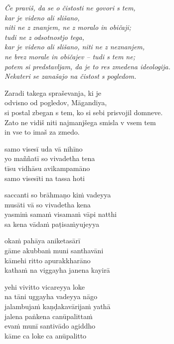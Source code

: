 \emph{Če praviš, da se o čistosti ne govori s tem,\\\vin kar je videno ali slišano,\\
niti ne z znanjem, ne z moralo in običaji;\\
tudi ne z odsotnostjo tega,\\\vin kar je videno ali slišano, niti ne z neznanjem,\\
ne brez morale in običajev -- tudi s tem ne;\\
potem si predstavljam, da je to res zmedena ideologija.\\
Nekateri se zanašajo na čistost s pogledom.}

Zaradi takega spraševanja, ki je\\\vin odvisno od pogledov, Māgandiya,\\
si postal zbegan s tem, ko si sebi prisvojil domneve.\\
Zato ne vidiš niti najmanjšega smisla v vsem tem\\
in vse to imaš za zmedo.


\clearpage

samo visesī uda vā nihīno\\
yo maññatī so vivadetha tena\\
tīsu vidhāsu avikampamāno\\
samo visesīti na tassa hoti

saccanti so brāhmaṇo kiṁ vadeyya\\
musāti vā so vivadetha kena\\
yasmiṁ samaṁ visamaṁ vāpi natthi\\
sa kena vādaṁ paṭisaṁyujeyya

okaṁ pahāya aniketasārī\\
gāme akubbaṁ muni santhavāni\\
kāmehi ritto apurakkharāno\\
kathaṁ na viggayha janena kayirā

yehi vivitto vicareyya loke\\
na tāni uggayha vadeyya nāgo\\
jalambujaṁ kaṇḍakavārijaṁ yathā\\
jalena paṅkena canūpalittaṁ\\
evaṁ munī santivādo agiddho\\
kāme ca loke ca anūpalitto


